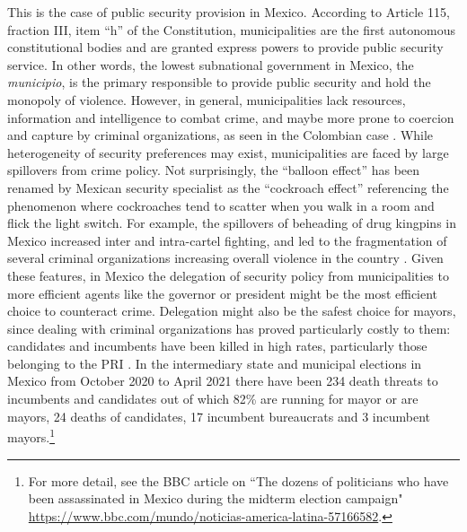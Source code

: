 \documentclass[12pt]{amsart}
\numberwithin{equation}{section}
\theoremstyle{definition}
\theoremstyle{definition}
\theoremstyle{definition}
\begin{document}
This is the case of public security provision in Mexico. According to Article 115, fraction III, item ``h'' of the Constitution, municipalities are the first autonomous constitutional bodies and are granted express powers to provide public security service. In other words, the lowest subnational government in Mexico, the \emph{municipio}, is the primary responsible to provide public security and hold the monopoly of violence. However, in general, municipalities lack resources, information and intelligence to combat crime, and maybe more prone to coercion and capture by criminal organizations, as seen in the Colombian case \citep{chacon_2018}. While heterogeneity of security preferences may exist, municipalities are faced by large spillovers from crime policy. Not surprisingly, the ``balloon effect'' has been renamed by Mexican security specialist as the ``cockroach effect'' referencing the phenomenon where cockroaches tend to scatter when you walk in a room and flick the light switch. For example, the spillovers of beheading of drug kingpins in Mexico increased inter and intra-cartel fighting, and led to the fragmentation of several criminal organizations increasing overall violence in the country \citep{guerrero_2011}. Given these features, in Mexico the delegation of security policy from municipalities to more efficient agents like the governor or president might be the most efficient choice to counteract crime. Delegation might also be the safest choice for mayors, since dealing with criminal organizations has proved particularly costly to them: candidates and incumbents have been killed in high rates, particularly those belonging to the PRI \citep{ley_trejo_2020}. In the intermediary state and municipal elections in Mexico from October 2020 to April 2021 there have been 234 death threats to incumbents and candidates out of which 82\% are running for mayor or are mayors, 24 deaths of candidates, 17 incumbent bureaucrats and 3 incumbent mayors.\footnote{For more detail, see the BBC article on ``The dozens of politicians who have been assassinated in Mexico during the midterm election campaign" \url{https://www.bbc.com/mundo/noticias-america-latina-57166582}.} 
\end{document}
